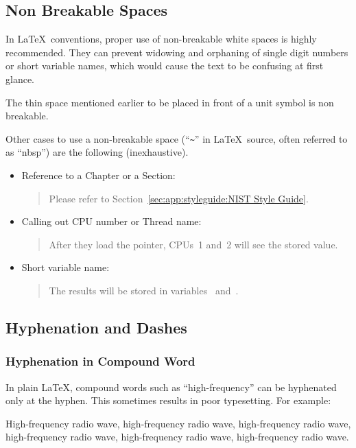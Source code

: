 \subsection{Non Breakable Spaces}
\label{sec:app:styleguide:Non Breakable Spaces}

In \LaTeX\ conventions, proper use of non-breakable white spaces
is highly recommended. They can prevent widowing and orphaning
of single digit numbers or short variable names, which would
cause the text to be confusing at first glance.

The thin space mentioned earlier to be placed in front of a unit
symbol is non breakable.

Other cases to use a non-breakable space (``\verb|~|'' in \LaTeX\
source, often referred to as ``nbsp'')
are the following (inexhaustive).

\begin{itemize}
\item Reference to a Chapter or a Section:
  \begin{quote}
    Please refer to Section~\ref{sec:app:styleguide:NIST Style Guide}.
  \end{quote}
\item Calling out CPU number or Thread name:
  \begin{quote}
    After they load the pointer, CPUs~1 and~2 will see the stored
    value.
  \end{quote}
\item Short variable name:
  \begin{quote}
    The results will be stored in variables~ and~.
  \end{quote}
\end{itemize}

\subsection{Hyphenation and Dashes}
\label{sec:app:styleguide:Hyphenation and Dashes}

\subsubsection{Hyphenation in Compound Word}
\label{sec:app:styleguide:Hyphenation in Compound Word}

In plain \LaTeX, compound words such as ``high-frequency''
can be hyphenated only at the hyphen. This sometimes results
in poor typesetting. For example:

\begin{center}\begin{minipage}{2.55in}\vspace{0.6\baselineskip}
  High-frequency radio wave, high-frequency radio wave,
  high-frequency radio wave, high-frequency radio wave,
  high-frequency radio wave, high-frequency radio wave.
\vspace{0.6\baselineskip}\end{minipage}\end{center}

